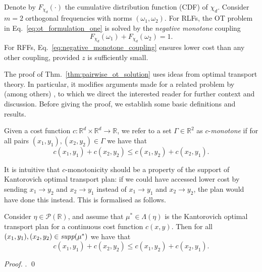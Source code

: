 \begin{theorem}[Solution to OT problem when $m=2$]\label{thm:app_pairwise_ot_solution}
Denote by $F_{\chi_d}(\cdot)$ the cumulative distribution function (CDF) of $\chi_d$. 
Consider $m=2$ orthogonal frequencies with norms $(\omega_1, \omega_2)$.
For RLFs, the OT problem in Eq.~\ref{eq:ot_formulation_one} is solved by the \emph{negative monotone} coupling
\begin{equation} \label{eq:app_negative_monotone_coupling}
    F_{\chi_d}(\omega_1) + F_{\chi_d}(\omega_2) = 1.
\end{equation}
For RFFs, Eq.~\ref{eq:negative_monotone_coupling} ensures lower cost than any other coupling, provided $z$ is sufficiently small.
\end{theorem}

The proof of Thm.~\ref{thm:pairwise_ot_solution} uses ideas from optimal transport theory. In particular, it modifies arguments made for a related problem by (among others) \citet{thorpe2019introduction}, to which we direct the interested reader for further context and discussion. Before giving the proof, we establish some basic definitions and results.

\begin{definition}
    Given a cost function $c:\mathbb{R}^d \times \mathbb{R}^d \to \mathbb{R}$, we refer to a set $\Gamma \in \mathbb{R}^2$ as $c$-\emph{monotone} if for all pairs $(x_1,y_1),(x_2,y_2) \in \Gamma$ we have that 
\begin{equation}
    c(x_1,y_1) + c(x_2,y_2) \leq c(x_1,y_2)+c(x_2,y_1).
\end{equation}
\end{definition}

It is intuitive that $c$-monotonicity should be a property of the support of Kantorovich optimal transport plan: if we could have accessed lower cost by sending $x_1 \to y_2$ and $x_2 \to y_1$ instead of $x_1 \to y_1$ and $x_2 \to y_2$, the plan would have done this instead. This is formalised as follows. 

\begin{lemma} \label{prop:c_mon}
Consider $\eta \in \mathcal{P}(\mathbb{R})$, and assume that $\mu^* \in \Lambda(\eta)$ is the Kantorovich optimal transport plan for a continuous cost function $c(x,y)$. Then for all $(x_1,y_1),(x_2,y_2) \in \emph{\textrm{supp}}(\mu^*)$ we have that
\begin{equation} \label{eq:c_monotonic}
    c(x_1,y_1) + c(x_2,y_2) \leq c(x_1,y_2)+c(x_2,y_1).
\end{equation}
\end{lemma}
\emph{Proof.} \citet{thorpe2019introduction}. \qed

